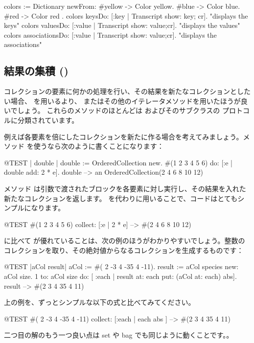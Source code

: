 \documentclass[a4paper,10pt,twoside]{book}
\begin{document}
\begin{code}{}
colors := Dictionary newFrom: { #yellow -> Color yellow. #blue -> Color blue. #red -> Color red }.
colors keysDo: [:key | Transcript show: key; cr].                    "displays the keys"
colors valuesDo: [:value | Transcript show: value;cr].            "displays the values"
colors associationsDo: [:value | Transcript show: value;cr].  "displays the associations"
\end{code}

\subsection{結果の集積 ()}
コレクションの要素に何かの処理を行い、その結果を新たなコレクションとしたい場合、 を用いるより、 またはその他のイテレータメソッドを用いたほうが良いでしょう。
これらのメソッドのほとんどは  およびそのサブクラスの  プロトコルに分類されています。

例えば各要素を倍にしたコレクションを新たに作る場合を考えてみましょう。メソッド  を使うなら次のように書くことになります：

\begin{code}{@TEST | double |}
double := OrderedCollection new.
#(1 2 3 4 5 6) do: [:e | double add: 2 * e].
double --> an OrderedCollection(2 4 6 8 10 12)
\end{code}

\noindent
メソッド  は引数で渡されたブロックを各要素に対し実行し、その結果を入れた新たなコレクションを返します。
 を代わりに用いることで、コードはとてもシンプルになります。
\begin{code}{@TEST}
#(1 2 3 4 5 6) collect: [:e | 2 * e] --> #(2 4 6 8 10 12)
\end{code}

 に比べて  が優れていることは、次の例のほうがわかりやすいでしょう。整数のコレクションを取り、その絶対値からなるコレクションを生成するものです：

\begin{code}{@TEST |aCol result|}
aCol :=  #( 2 -3 4 -35 4 -11).
result := aCol species new: aCol size.
1 to: aCol size do: [ :each | result at: each put: (aCol at: each) abs].
result --> #(2 3 4 35 4 11)
\end{code}
\noindent
上の例を、ずっとシンプルな以下の式と比べてみてください。
\begin{code}{@TEST}
#( 2 -3 4 -35 4 -11) collect: [:each | each abs ] --> #(2 3 4 35 4 11)
\end{code}
\noindent
二つ目の解のもう一つ良い点は set や bag でも同じように動くことです。。
\end{document}
